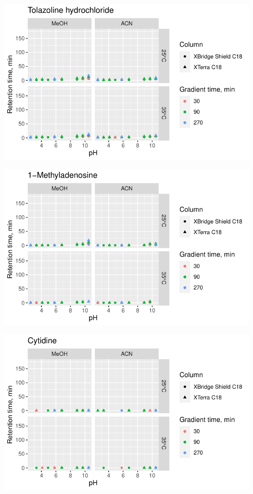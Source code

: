 \documentclass[
  letterpaper,
  DIV=11,
  numbers=noendperiod]{scrreprt}
\begin{document}
\includegraphics{index_files/figure-pdf/unnamed-chunk-4-69.pdf}

\includegraphics{index_files/figure-pdf/unnamed-chunk-4-70.pdf}

\includegraphics{index_files/figure-pdf/unnamed-chunk-4-71.pdf}
\end{document}
